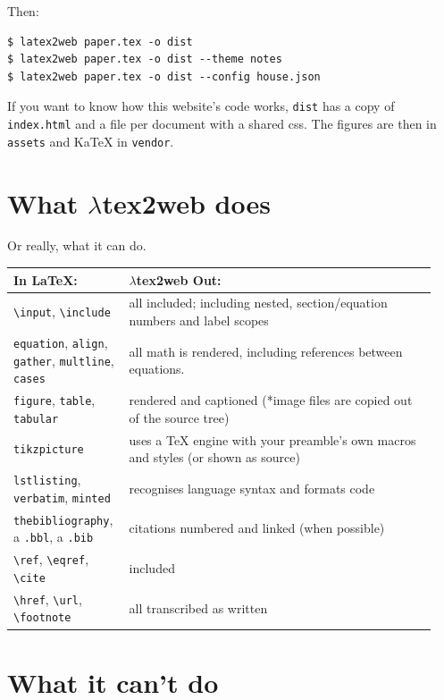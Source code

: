 \documentclass[11pt]{article}
\begin{document}
Then:

\begin{verbatim}
$ latex2web paper.tex -o dist
$ latex2web paper.tex -o dist --theme notes
$ latex2web paper.tex -o dist --config house.json
\end{verbatim}

If you want to know how this website's code works, \texttt{dist} has a copy of
\texttt{index.html} and a file per document with a shared css. The figures are
then in \texttt{assets} and KaTeX in \texttt{vendor}.

\section{What $\lambda$tex2web does}

Or really, what it can do.

\begin{tabular}{@{}p{0.24\linewidth}p{0.7\linewidth}@{}}
\toprule
\textbf{In LaTeX:} & \textbf{$\lambda$tex2web Out:} \\
\midrule
\texttt{\textbackslash input}, \texttt{\textbackslash include} &
  all included; including nested, section/equation numbers and label scopes \\
\texttt{equation}, \texttt{align}, \texttt{gather}, \texttt{multline},
  \texttt{cases} &
  all math is rendered, including references between equations. \\
\texttt{figure}, \texttt{table}, \texttt{tabular} &
  rendered and captioned (*image files are copied out of the source tree) \\
\texttt{tikzpicture} &
  uses a TeX engine with your preamble's own macros and styles (or shown as
  source) \\
\texttt{lstlisting}, \texttt{verbatim}, \texttt{minted} &
  recognises language syntax and formats code \\
\texttt{thebibliography}, a \texttt{.bbl}, a \texttt{.bib} &
  citations numbered and linked (when possible) \\
\texttt{\textbackslash ref}, \texttt{\textbackslash eqref},
  \texttt{\textbackslash cite} &
  included \\
\texttt{\textbackslash href}, \texttt{\textbackslash url},
  \texttt{\textbackslash footnote} &
  all transcribed as written \\
\bottomrule
\end{tabular}

\section{What it can't do}
\end{document}
